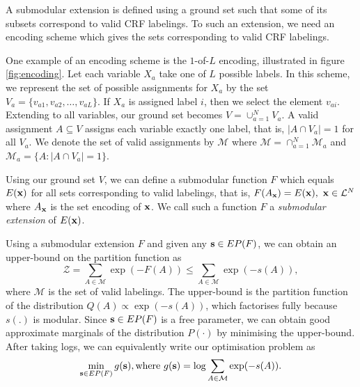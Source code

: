  A submodular extension is defined using
a ground set such that some of its subsets correspond to valid CRF labelings.
To such an extension, we need an encoding scheme which gives the sets corresponding to valid CRF labelings. 

One example of an encoding scheme is the $1$-of-$L$ encoding, illustrated in figure \ref{fig:encoding}. Let each variable $X_a$ take one of $L$ possible labels. In this scheme, we represent the set of possible assignments for $X_a$ by the set $V_a = \{v_{a1}, v_{a2}, \dots, v_{aL}\}$. If $X_a$ is assigned label $i$, then we select the element $v_{ai}$. Extending to all variables, our ground set becomes $V = \cup_{a = 1}^N V_a$. A valid assignment $A \subseteq V$ assigns each variable exactly one label, that is, $|A \cap V_a| = 1$ for all $V_a$. We denote the set of valid assignments by $\mathcal M$ where $\mathcal{M} = \cap_{a = 1}^{N} \mathcal{M}_a$ and $\mathcal{M}_a = \{A: |A \cap V_a| = 1\}$.


Using our ground set $V$, we can define a submodular function $F$ which equals $E(\bf x)$ for all sets corresponding to valid labelings, that is, $F(A_{\bf x}) = E({\bf x}),\ {\bf x} \in {\mathcal L}^N$ where $A_{\bf x}$ is the set encoding of $\bf x$. We call such a function $F$ a {\it submodular extension} of $E({\bf x})$. 

 Using a submodular extension $F$ and given any ${\bf s} \in EP(F)$, we can obtain an upper-bound on the partition function as
\begin{equation}
    {\mathcal Z} = \sum_{A \in {\mathcal M}} \exp(-F(A)) \leq \sum_{A \in {\mathcal M}} \exp(-s(A)),
\end{equation}
where $\mathcal M$ is the set of valid labelings. The upper-bound is the partition function of the distribution $Q(A) \propto \exp(-s(A))$, which factorises fully because $s(.)$ is modular. Since ${\bf s} \in EP(F)$ is a free parameter, we can obtain good approximate marginals of the distribution $P(\cdot)$ by minimising the upper-bound. After taking logs, we can equivalently write our optimisation problem as
\begin{equation}
  \min_{{\bf s} \in EP(F)} g({\bf s}), \text{where } g({\bf s}) = \log \sum_{A \in {\mathcal M}} \exp(-s(A)).
\label{eq:min_upper_bound}
\end{equation}

